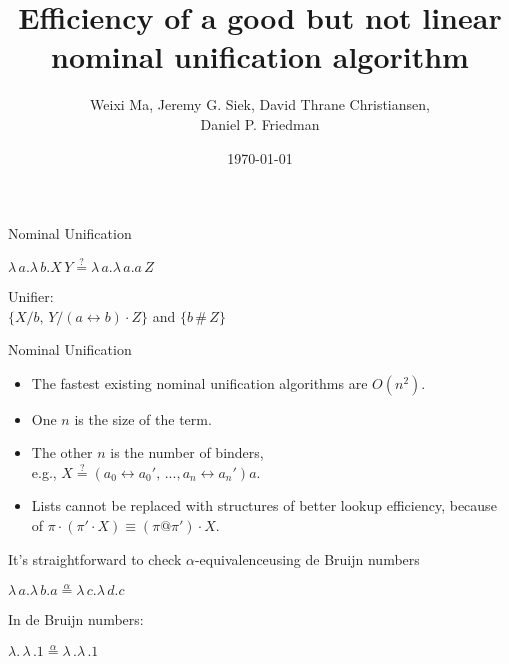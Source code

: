 \documentclass[pdf]{beamer}
\date{\today}
\title{Efficiency of a good but not linear nominal unification algorithm}
\author{Weixi Ma, Jeremy G. Siek, David Thrane Christiansen,\\ Daniel P. Friedman}
\newcommand{\bd}[2] {
 #1/ #2
}
\newcommand{\app}[2] {
#1\, #2
}
\newcommand{\swap}[2] {
  #1\leftrightarrow#2
}
\newcommand{\alphaeq}[2] {
  #1\stackrel{\alpha}{=}#2
}
\newcommand{\eqha}[2] {
  #1\stackrel{?}{=}#2
}
\begin{document}


\begin{frame}
  \maketitle
\end{frame}

\begin{frame}{Nominal Unification~\citep{urban_nominal_2004}}
  
  {\centering
    $\lambda\,a.\lambda\,b.\app{X}{Y} \stackrel{?}{=} \lambda\,a.\lambda\,a.\app{a}{Z}$
    \par}
  \vspace{1cm}
  {\centering
    Unifier:\\
    $\{\bd{X}{b},\,\bd{Y}{(\swap{a}{b})\cdot Z}\}$ and $\{b\,\#\,Z\}$
    \par}
\end{frame}

\begin{frame}{Nominal Unification~\citep{urban_nominal_2004}}

  {\centering
    \begin{itemize}
    \item The fastest existing nominal unification algorithms are $O(n^2)$.
    \item One $n$ is the size of the term.
    \item The other $n$ is the number of binders, \\e.g., $\eqha{X}{(\swap{a_0}{a_0'},\,...,\swap{a_n}{a_n'})a}$.
    \item Lists cannot be replaced with structures of better lookup efficiency,
      because of $\pi\cdot(\pi'\cdot X) \equiv (\pi@\pi')\cdot X$.
    \end{itemize}
   \par}
\end{frame}

\begin{frame}{It's straightforward to check $\alpha$-equivalence}{using de Bruijn numbers~\citep{de_bruijn_lambda_1972}}
 
 {\centering
   $\alphaeq{\lambda\,a.\lambda\,b.a}{\lambda\,c.\lambda\,d.c}$
 \par}
\vspace{1cm}
  {\centering
  In de Bruijn numbers:\par}
 {\centering
   $\alphaeq{\lambda.\,\lambda\,.1}{\lambda\,.\lambda\,.1}$
 \par}
\end{frame}
\end{document}
